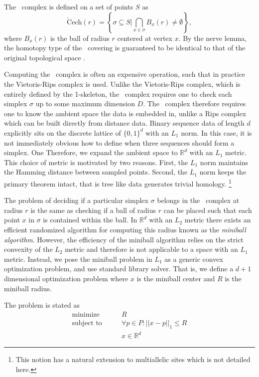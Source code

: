 The \Cech\ complex is defined on a set of points $S$ as
\begin{equation}
\mathrm{\check{C}ech}(r) = \left\{\sigma \subseteq S | \bigcap_{x\in\sigma} B_x(r) \neq \emptyset \right\},
\end{equation}
where $B_x(r)$ is the ball of radius $r$ centered at vertex $x$.
By the nerve lemma, the homotopy type of the \Cech\ covering is guaranteed to be identical to that of the original topological space \citep{Borsuk:1948}.

Computing the \Cech\ complex is often an expensive operation, such that in practice the Vietoris-Rips complex is used.
Unlike the Vietoris-Rips complex, which is entirely defined by the 1-skeleton, the \Cech\ complex requires one to check each simplex $\sigma$ up to some maximum dimension $D$.
The \Cech\ complex therefore requires one to know the ambient space the data is embedded in, unlike a Rips complex which can be built directly from distance data.
Binary sequence data of length $d$ explicitly sits on the discrete lattice of $\{0,1\}^d$ with an $L_1$ norm.
In this case, it is not immediately obvious how to define when three sequences should form a simplex.
One
Therefore, we expand the ambient space to $\mathbb{R}^d$ with an $L_1$ metric.
This choice of metric is motivated by two reasons.
First, the $L_1$ norm maintains the Hamming distance between sampled points.
Second, the $L_1$ norm keeps the primary theorem intact, that is tree like data generates trivial homology.
\footnote{This notion has a natural extension to multiallelic sites which is not detailed here.}

The problem of deciding if a particular simplex $\sigma$ belongs in the \Cech\ complex at radius $r$ is the same as checking if a ball of radius $r$ can be placed such that each point $x$ in $\sigma$ is contained within the ball.
In $\mathbb{R}^d$ with an $L_2$ metric there exists an efficient randomized algorithm for computing this radius known as the \emph{miniball algorithm}.\autocite{Gartner:1999}
However, the efficiency of the miniball algorithm relies on the strict convexity of the $L_2$ metric and therefore is not applicable to a space with an $L_1$ metric.
Instead, we pose the miniball problem in $L_1$ as a generic convex optimization problem, and use standard library solver.
That is, we define a $d+1$ dimensional optimization problem where $x$ is the miniball center and $R$ is the miniball radius.

The problem is stated as
\begin{align*}
\text{minimize}\qquad   &  R \\
\text{subject to}\qquad & \forall p \in P: ||x-p||_{1} \leq R \\
                        & x \in \mathbb{R}^d
\end{align*}

